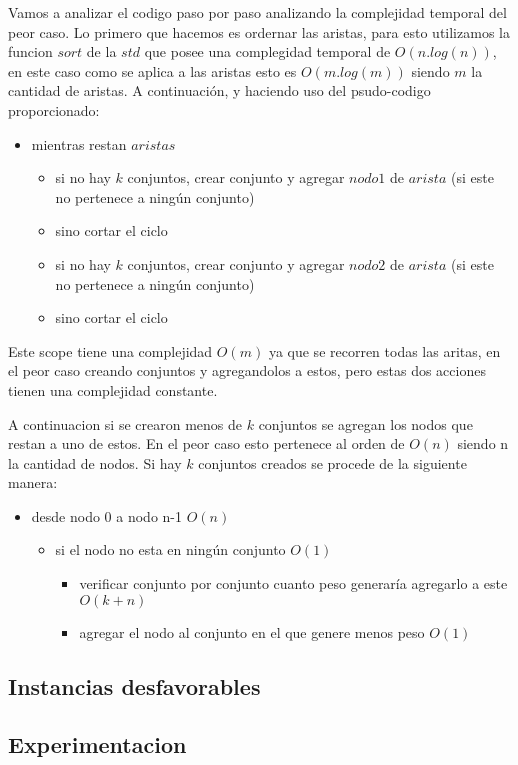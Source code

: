 Vamos a analizar el codigo paso por paso analizando la complejidad temporal del peor caso.
Lo primero que hacemos es ordernar las aristas, para esto utilizamos la funcion $sort$ de la $std$ que posee una complegidad temporal de $O(n.log(n))$, en este caso como se aplica a las aristas esto es $O(m.log(m))$ siendo $m$ la cantidad de aristas.
A continuación, y haciendo uso del psudo-codigo proporcionado:
\begin{itemize}
\item mientras restan $aristas$ 
  \begin{itemize}
  \item si no hay $k$ conjuntos, crear conjunto y agregar $nodo1$ de $arista$ (si este no pertenece a ningún conjunto)
  \item sino cortar el ciclo  
  \item si no hay $k$ conjuntos, crear conjunto y agregar $nodo2$ de $arista$ (si este no pertenece a ningún conjunto)
  \item sino cortar el ciclo  
  \end{itemize}
\end{itemize}
Este scope tiene una complejidad $O(m)$ ya que se recorren todas las aritas, en el peor caso creando conjuntos y agregandolos a estos, pero estas dos acciones tienen una complejidad constante.

A continuacion si se crearon menos de $k$ conjuntos se agregan los nodos que restan a uno de estos. En el peor caso esto pertenece al orden de $O(n)$ siendo n la cantidad de nodos.
Si hay $k$ conjuntos creados se procede de la siguiente manera:
\begin{itemize}
\item desde nodo 0 a nodo n-1   $O(n)$
  \begin{itemize}
  \item si el nodo no esta en ningún conjunto $O(1)$
    \begin{itemize}
      \item verificar conjunto por conjunto cuanto peso generaría agregarlo a este $O(k+n)$
      \item agregar el nodo al conjunto en el que genere menos peso $O(1)$
    \end{itemize}
  \end{itemize}
\end{itemize}



\subsection{Instancias desfavorables}


\subsection{Experimentacion}


